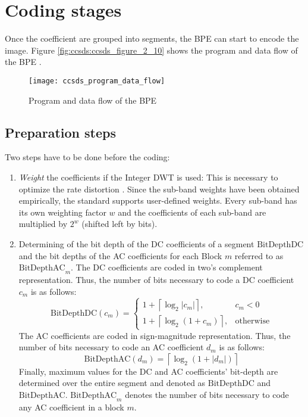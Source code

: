 \section{Coding stages}\label{sec:fundamentals:ccsds_bpe}
Once the coefficient are grouped into segments, the \gls{BPE} can start to encode the image. Figure \autoref{fig:ccsds:ccsds_figure_2_10} shows the program and data flow of the \gls{BPE} \cite{CCSDS122green}.
\begin{figure}[tb]
  \centering
  \texttt{[image: ccsds\_program\_data\_flow]}
  \caption[Program and data flow of the BitPlaneEncoder]{Program and data flow of the \gls{BPE} \cite[p.~2-12]{CCSDS122green}}
  \label{fig:ccsds:ccsds_figure_2_10}
\end{figure}

\subsection{Preparation steps}
Two steps have to be done before the coding:
\begin{enumerate}
  \item \textit{Weight} the coefficients if the Integer DWT is used: This is necessary to optimize the rate distortion \cite[p.~E-1~ff.]{CCSDS122green}. Since the sub-band weights have been obtained empirically, the standard supports user-defined weights. Every sub-band has its own weighting factor $w$ and the coefficients of each sub-band are multiplied by $2^w$ (shifted left by \unit[w]{bits}).
  \item Determining of the bit depth of the DC coefficients of a segment $\mathrm{BitDepthDC}$ and the bit depths of the AC coefficients for each Block $m$ referred to as $\mathrm{BitDepthAC}_m$. The DC coefficients are coded in two's complement representation. Thus, the number of bits necessary to code a DC coefficient $c_m$ is as follows:
\begin{equation}
\mathrm{BitDepthDC}(c_m)=\left\{
  \begin{array}{ll}
    1+\left\lceil\log_2\left|c_m\right|\right\rceil,   & c_m<0\\
    1+\left\lceil\log_2\left(1+c_m\right)\right\rceil, & \mathrm{otherwise}
  \end{array}\right.
\end{equation}
The AC coefficients are coded in sign-magnitude representation. Thus, the number of bits necessary to code an AC coefficient $d_m$ is as follows:
\begin{equation}
\mathrm{BitDepthAC}(d_m)=\left\lceil\log_2\left(1+\left|d_m\right|\right)\right\rceil
\end{equation}
Finally, maximum values for the DC and AC coefficients' bit-depth are determined over the entire segment and denoted as $\mathrm{BitDepthDC}$ and $\mathrm{BitDepthAC}$. $\mathrm{BitDepthAC}_m$ denotes the number of bits necessary to code any AC coefficient in a block $m$.
\end{enumerate}

